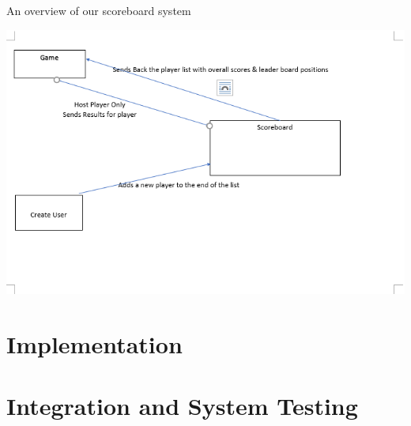 An overview of our scoreboard system

\includegraphics[width=1\columnwidth]{img/MariaDBPic.PNG}

\newpage
\section{Implementation}

\newpage
\section{Integration and System Testing}